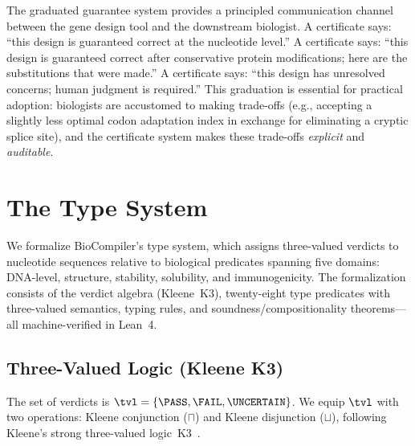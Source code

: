 The graduated guarantee system provides a principled communication
channel between the gene design tool and the downstream
biologist.
A \GOLD{} certificate says: ``this design is guaranteed correct at the
nucleotide level.''
A \SILVER{} certificate says: ``this design is guaranteed correct
after conservative protein modifications; here are the substitutions
that were made.''
A \BRONZE{} certificate says: ``this design has unresolved concerns;
human judgment is required.''
This graduation is essential for practical adoption: biologists are
accustomed to making trade-offs (e.g., accepting a slightly less
optimal codon adaptation index in exchange for eliminating a cryptic
splice site), and the certificate system makes these trade-offs
\emph{explicit} and \emph{auditable}.

\section{The Type System}\label{sec:typesys}

We formalize BioCompiler's type system, which assigns three-valued
verdicts to nucleotide sequences relative to biological predicates
spanning five domains: DNA-level, structure, stability, solubility,
and immunogenicity.
The formalization consists of the verdict algebra (Kleene~K3),
twenty-eight type predicates with three-valued semantics, typing
rules, and soundness/compositionality theorems---all machine-verified
in Lean~4.

\subsection{Three-Valued Logic (Kleene K3)}\label{sec:3vl}

The set of verdicts is $\tvl = \{\PASS, \FAIL, \UNCERTAIN\}$.
We equip $\tvl$ with two operations: Kleene conjunction ($\sqcap$) and
Kleene disjunction ($\sqcup$), following Kleene's strong three-valued
logic~K3~\cite{kleene1952introduction}.


